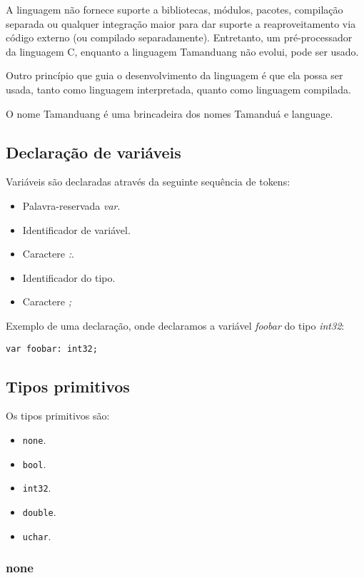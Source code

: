 \documentclass[12pt, a4paper]{article}
\begin{document}
A linguagem não fornece suporte a bibliotecas, módulos, pacotes, compilação
separada ou qualquer integração maior para dar suporte a reaproveitamento via
código externo (ou compilado separadamente). Entretanto, um pré-processador da
linguagem C, enquanto a linguagem Tamanduang não evolui, pode ser usado.

Outro princípio que guia o desenvolvimento da linguagem é que ela possa ser
usada, tanto como linguagem interpretada, quanto como linguagem compilada.

O nome Tamanduang é uma brincadeira dos nomes Tamanduá e language.

\subsection{Declaração de variáveis}

Variáveis são declaradas através da seguinte sequência de tokens:

\begin{itemize}
\item Palavra-reservada \emph{var}.
\item Identificador de variável.
\item Caractere \emph{:}.
\item Identificador do tipo.
\item Caractere \emph{;}
\end{itemize}

Exemplo de uma declaração, onde declaramos a variável \emph{foobar} do tipo
\emph{int32}:

\begin{verbatim}
var foobar: int32;
\end{verbatim}

\subsection{Tipos primitivos}

Os tipos primitivos são:

\begin{itemize}
\item \texttt{none}.
\item \texttt{bool}.
\item \texttt{int32}.
\item \texttt{double}.
\item \texttt{uchar}.
\end{itemize}

\subsubsection{none}
\end{document}
